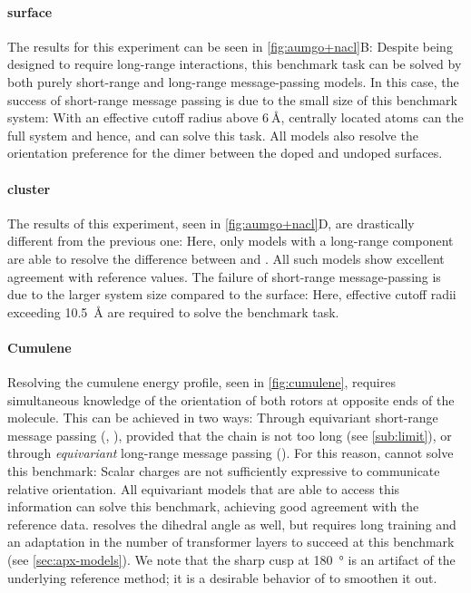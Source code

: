 \documentclass[10pt]{article} %
\begin{document}
\paragraph{ surface} The results for this experiment can be seen in \cref{fig:aumgo+nacl}B: Despite being designed to require long-range interactions, this benchmark task can be solved by both purely short-range and long-range message-passing models. 
In this case, the success of short-range message passing is due to the small size of this benchmark system: With an effective cutoff radius above $\qty{6}{\angstrom}$, centrally located atoms can  the full system and hence, \mace and \pet can solve this task.
All models also resolve the orientation preference for the  dimer between the doped and undoped surfaces.

\paragraph{ cluster}
The results of this experiment, seen in \cref{fig:aumgo+nacl}D, are drastically different from the previous one: Here, only models with a long-range component are able to resolve the difference between  and . All such models show excellent agreement with reference values. The failure of short-range message-passing is due to the larger system size compared to the  surface: Here, effective cutoff radii exceeding \qty{10.5}{\angstrom} are required to solve the benchmark task.



\paragraph{Cumulene} Resolving the cumulene energy profile, seen in \cref{fig:cumulene}, requires simultaneous knowledge of the orientation of both rotors at opposite ends of the molecule. This can be achieved in two ways: Through equivariant short-range message passing (\mace, \pet), provided that the chain is not too long (see \cref{sub:limit}), or through \emph{equivariant} long-range message passing (\lorem). For this reason,  \cace cannot solve this benchmark: Scalar charges are not sufficiently expressive to communicate relative orientation.
All equivariant models that are able to access this information can solve this benchmark, achieving good agreement with the reference data. 
\pet resolves the dihedral angle as well, but requires long training and an adaptation in the number of transformer layers to succeed at this benchmark (see \cref{sec:apx-models}). 
We note that the sharp cusp at \qty{180}{\degree} is an artifact of the underlying reference method; it is a desirable behavior of \mlps to smoothen it out.
\end{document}
